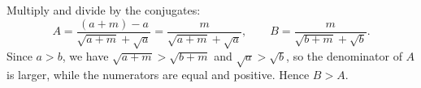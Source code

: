 Multiply and divide by the conjugates:
\[
A=\dfrac{(a+m)-a}{\sqrt{a+m}+\sqrt a}=\dfrac{m}{\sqrt{a+m}+\sqrt a},\qquad B=\dfrac{m}{\sqrt{b+m}+\sqrt b}.
\]
Since $a>b$, we have $\sqrt{a+m}>\sqrt{b+m}$ and $\sqrt a>\sqrt b$, so the denominator of $A$ is larger, while the numerators are equal and positive. Hence $\boxed{B>A}$.
